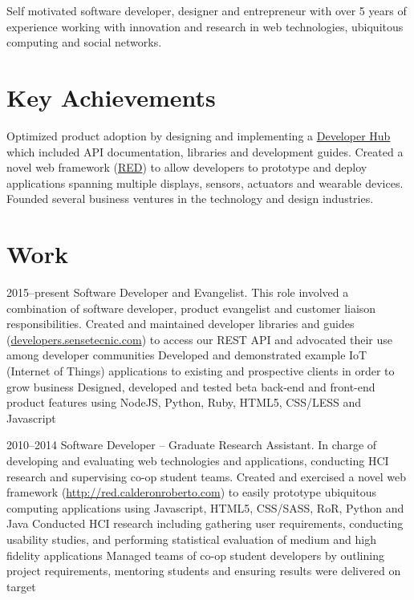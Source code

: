 \documentclass[full]{rvca}
\begin{document}

\begin{statement}
Self motivated software developer, designer and entrepreneur with over 5 years of experience working with innovation and research in web technologies, ubiquitous computing and social networks.
\end{statement}

\section{Key Achievements}

\achievements
{Optimized product adoption by designing and implementing a \href{http://developers.sensetecnic.com/}{Developer Hub} which included API documentation, libraries and development guides.}
{Created a novel web framework (\href{http://red.calderonroberto.com}{RED}) to allow developers 
to prototype and deploy applications spanning multiple displays, sensors, actuators and wearable devices.}
{Founded several business ventures in the technology and design industries.}
{}

\section{Work}


{2015--present}%
{Software Developer and Evangelist.} %
{This role involved a combination of software developer, product evangelist and customer liaison responsibilities.}%
{Created and maintained developer libraries and guides (\href{http://developers.sensetecnic.com}{developers.sensetecnic.com}) to access our REST API and advocated their use among developer communities}
{Developed and demonstrated example IoT (Internet of Things) applications to existing and prospective clients in order to grow business}
{Designed, developed and tested beta back-end and front-end product features using NodeJS, Python, Ruby, HTML5, CSS/LESS and Javascript}
{}
{}

{2010--2014}%
{Software Developer -- Graduate Research Assistant.} %
{In charge of developing and evaluating web technologies and applications, conducting HCI research and supervising co-op student teams.} %
{Created and exercised a novel web framework (\href{http://red.calderonroberto.com}{http://red.calderonroberto.com}) to easily prototype ubiquitous computing applications  using Javascript, HTML5, CSS/SASS, RoR, Python and Java}
{Conducted HCI research including gathering user requirements, conducting usability studies, and performing statistical evaluation of medium and high fidelity applications}
{Managed teams of co-op student developers by outlining project requirements, mentoring students and ensuring results were delivered on target}
{}
{}
\end{document}
